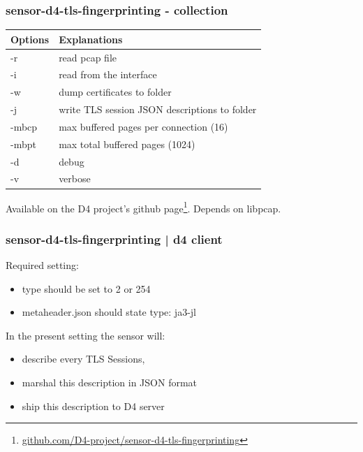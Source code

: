 \documentclass{beamer}
\begin{document}
\begin{frame}
        \frametitle{sensor-d4-tls-fingerprinting - collection}

  


\begin{tabular}{l|l}
Options & Explanations\\
\hline
  -r & read pcap file\\
  -i & read from the interface \\
  -w & dump certificates to folder\\
  -j & write TLS session JSON descriptions to folder\\
  -mbcp & max buffered pages per connection (16) \\
  -mbpt & max total buffered pages (1024) \\
  -d & debug \\
  -v & verbose
\end{tabular}

\vspace{.8cm}
Available on the D4 project's github page\footnote{\url{github.com/D4-project/sensor-d4-tls-fingerprinting}}.
Depends on libpcap.

\end{frame}


\begin{frame}[fragile]
        \frametitle{sensor-d4-tls-fingerprinting | d4 client} 
        Required setting:
        \begin{itemize}
        \item type should be set to 2 or 254
          \item metaheader.json should state type: ja3-jl
        \end{itemize}
        
        \vspace{.5cm}
        
        In the present setting the sensor will:
        \begin{itemize}
          \item describe every TLS Sessions,
          \item marshal this description in JSON format
          \item ship this description to D4 server
        \end{itemize}
\end{frame}
\end{document}
